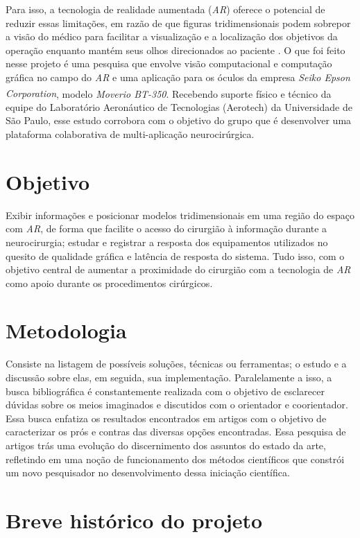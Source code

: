 Para isso, a tecnologia de realidade aumentada (\textit{AR}) oferece o potencial de reduzir essas limitações, em razão de que figuras tridimensionais podem sobrepor a visão do médico para facilitar a visualização e a localização dos objetivos da operação enquanto mantém seus olhos direcionados ao paciente \cite{enhancedvision}. O que foi feito nesse projeto é uma pesquisa que envolve visão computacional e computação gráfica no campo do \textit{AR} e uma aplicação para os óculos da empresa \textit{Seiko Epson Corporation\textsuperscript{\textregistered}}, modelo \textit{Moverio BT-350\texttrademark}. Recebendo suporte físico e técnico da equipe do Laboratório Aeronáutico de Tecnologias (Aerotech) da Universidade de São Paulo, esse estudo corrobora com o objetivo do grupo que é desenvolver uma plataforma colaborativa de multi-aplicação neurocirúrgica. 

\section{Objetivo}

Exibir informações e posicionar modelos tridimensionais em uma região do espaço com \textit{AR}, de forma que facilite o acesso do cirurgião à informação durante a neurocirurgia; estudar e registrar a resposta dos equipamentos utilizados no quesito de qualidade gráfica e latência de resposta do sistema. Tudo isso, com o objetivo central de aumentar a proximidade do cirurgião com a tecnologia de \textit{AR} como apoio durante os procedimentos cirúrgicos.

\section{Metodologia}

Consiste na listagem de possíveis soluções, técnicas ou ferramentas; o estudo e a discussão sobre elas, em seguida, sua implementação. Paralelamente a isso, a busca bibliográfica é constantemente realizada com o objetivo de esclarecer dúvidas sobre os meios imaginados e discutidos com o orientador e coorientador. Essa busca enfatiza os resultados encontrados em artigos com o objetivo de caracterizar os prós e contras das diversas opções encontradas. Essa pesquisa de artigos trás uma evolução do discernimento dos assuntos do estado da arte, refletindo em uma noção de funcionamento dos métodos científicos que constrói um novo pesquisador no desenvolvimento dessa iniciação científica.

\section{Breve histórico do projeto}

